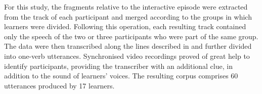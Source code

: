 For this study, the fragments relative to the interactive episode were extracted from the track of each participant and merged according to the groups in which learners were divided. Following this operation, each resulting track contained only the speech of the two or three participants who were part of the same group.  The data were then transcribed along the lines described in  and further divided into one-verb utterances. Synchronised video recordings proved of great help to identify participants, providing the transcriber with an additional clue, in addition to the sound of learners' voices. The resulting corpus comprises 60 utterances produced by 17 learners.
